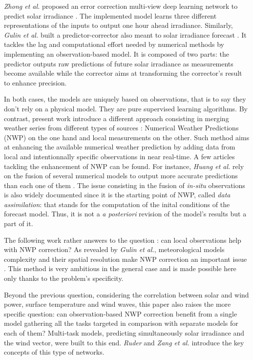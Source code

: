 \documentclass{article}
\newcommand{\saut}{\vspace{10px}}
\begin{document}
\saut

\emph{Zhong et al.} proposed an error correction multi-view deep learning network to predict
solar irradiance \cite{zhong_multi-view_2021}. The implemented model learns three different representations of the inputs 
to output one hour ahead irradiance. Similarly, \emph{Gulin et al.} built a predictor-corrector also meant to solar irradiance
forecast \cite{gulin_predictor-corrector_2015}. It tackles the lag and computational effort needed by numerical methods by implementing an observation-based model. It is composed of two parts: the predictor outputs raw
predictions of future solar irradiance as measurements become available while the corrector aims at transforming
the corrector's result to enhance precision.

\saut

In both cases, the models are uniquely based on observations, that is to say they don't rely on a physical model.
They are pure supervised learning algorithms. By contrast, present work introduce a different approach consisting in
merging weather series from different types of sources : Numerical Weather Predictions (NWP) on the one hand and
local measurements on the other. Such method aims at enhancing the available numerical weather prediction by 
adding data from local and intentionnally specific observations in near real-time. A few articles tackling the
enhancement of NWP can be found. For instance, \emph{Huang et al.} rely on the fusion of several numerical models to 
output more accurate predictions than each one of them \cite{huang_integrating_2012}. The issue consisting in the fusion 
of \emph{in-situ} observations is also widely documented since it is the starting point of NWP, called
\emph{data assimilation}: that stands for the computation
of the inital conditions of the forecast model. Thus, it is not a \emph{a posteriori} revision of the model's results but
a part of it. 

\saut

The following work rather answers to the question : can local observations help with NWP correction?
As revealed by \emph{Gulin et al.}, meteorological models complexity and their spatial resolution make NWP
correction an important issue \cite{gulin_predictor-corrector_2015}. This method is very ambitious in the general case and
is made possible here only thanks to the problem's specificity.

\saut

Beyond the previous question, considering the correlation between solar and wind power,
surface temperature and wind waves, this paper also raises the more specific question: can
observation-based NWP correction benefit from a single model gathering all the tasks targeted in comparison with
separate models for each of them? Multi-task models, predicting simultaneously solar irradiance and the wind vector,
were built to this end. \emph{Ruder} \cite{ruder_overview_2017} and \emph{Zang et al.} \cite{zhang_overview_2018}
introduce the key concepts of this type of networks.
\end{document}
